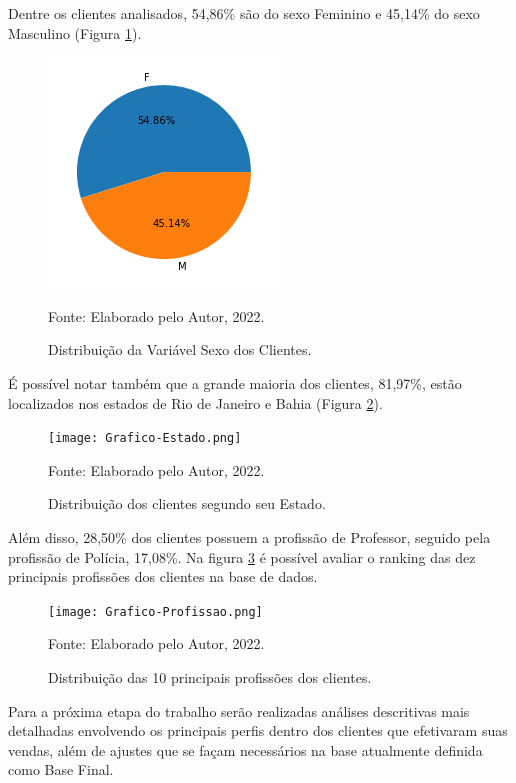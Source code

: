 Dentre os clientes analisados, 54,86\% são do sexo Feminino e 45,14\% do sexo Masculino (Figura \ref{fig:graf-sexo}).

\begin{figure}[H]
\captionsetup{labelfont=bf,size=normalsize}
    \centering
     \includegraphics[scale=0.7]{Grafico-Sexo.png}
\caption{Distribuição da Variável Sexo dos Clientes.} {\footnotesize Fonte: Elaborado pelo Autor, 2022.}
\label{fig:graf-sexo}
\end{figure}


É possível notar também que a grande maioria dos clientes, 81,97\%, estão localizados nos estados de Rio de Janeiro e Bahia (Figura \ref{fig:graf-estado}).

\begin{figure}[H]
\captionsetup{labelfont=bf,size=normalsize}
    \centering
     \texttt{[image: Grafico-Estado.png]}
\caption{Distribuição dos clientes segundo seu Estado.} {\footnotesize Fonte: Elaborado pelo Autor, 2022.}
\label{fig:graf-estado}
\end{figure}


Além disso, 28,50\% dos clientes possuem a profissão de Professor, seguido pela profissão de Polícia, 17,08\%. Na figura \ref{fig:graf-prof} é possível avaliar o ranking das dez principais profissões dos clientes na base de dados.

\begin{figure}[H]
\captionsetup{labelfont=bf,size=normalsize}
    \centering
     \texttt{[image: Grafico-Profissao.png]}
\caption{Distribuição das 10 principais profissões dos clientes.} {\footnotesize Fonte: Elaborado pelo Autor, 2022.}
\label{fig:graf-prof}
\end{figure}

Para a próxima etapa do trabalho serão realizadas análises descritivas mais detalhadas envolvendo os principais perfis dentro dos clientes que efetivaram suas vendas, além de ajustes que se façam necessários na base atualmente definida como Base Final.